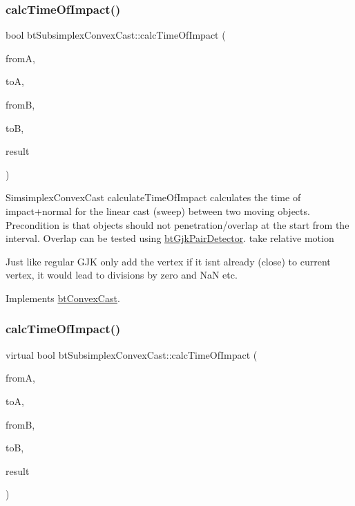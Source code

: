 \subsubsection{\texorpdfstring{calc\+Time\+Of\+Impact()}{calcTimeOfImpact()}\hspace{0.1cm}{\footnotesize\ttfamily [1/2]}}
{\footnotesize\ttfamily bool bt\+Subsimplex\+Convex\+Cast\+::calc\+Time\+Of\+Impact (\begin{DoxyParamCaption}\item[{const bt\+Transform \&}]{fromA,  }\item[{const bt\+Transform \&}]{toA,  }\item[{const bt\+Transform \&}]{fromB,  }\item[{const bt\+Transform \&}]{toB,  }\item[{\hyperlink{structbtConvexCast_1_1CastResult}{Cast\+Result} \&}]{result }\end{DoxyParamCaption})\hspace{0.3cm}{\ttfamily [virtual]}}

Simsimplex\+Convex\+Cast calculate\+Time\+Of\+Impact calculates the time of impact+normal for the linear cast (sweep) between two moving objects. Precondition is that objects should not penetration/overlap at the start from the interval. Overlap can be tested using \hyperlink{classbtGjkPairDetector}{bt\+Gjk\+Pair\+Detector}. take relative motion

Just like regular G\+JK only add the vertex if it isn\textquotesingle{}t already (close) to current vertex, it would lead to divisions by zero and NaN etc. 

Implements \hyperlink{classbtConvexCast_abaf0f25a8cccfcafdaabada83c8d2bfb}{bt\+Convex\+Cast}.

\mbox{\label{classbtSubsimplexConvexCast_ab5cfc6671de6ba064cd85301eb7b23ce}} 
\subsubsection{\texorpdfstring{calc\+Time\+Of\+Impact()}{calcTimeOfImpact()}\hspace{0.1cm}{\footnotesize\ttfamily [2/2]}}
{\footnotesize\ttfamily virtual bool bt\+Subsimplex\+Convex\+Cast\+::calc\+Time\+Of\+Impact (\begin{DoxyParamCaption}\item[{const bt\+Transform \&}]{fromA,  }\item[{const bt\+Transform \&}]{toA,  }\item[{const bt\+Transform \&}]{fromB,  }\item[{const bt\+Transform \&}]{toB,  }\item[{\hyperlink{structbtConvexCast_1_1CastResult}{Cast\+Result} \&}]{result }\end{DoxyParamCaption})\hspace{0.3cm}{\ttfamily [virtual]}}

